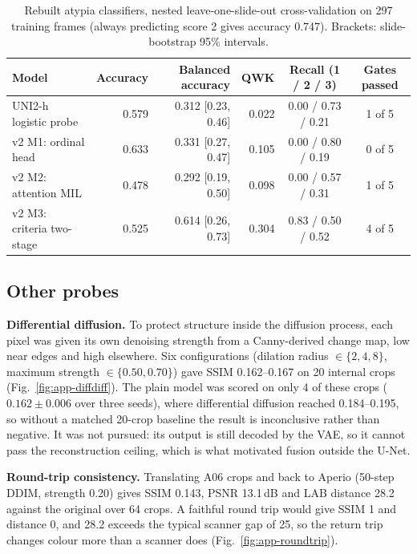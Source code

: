 \begin{table}[!tbp]
\centering
\caption{Rebuilt atypia classifiers, nested leave-one-slide-out cross-validation on 297 training frames
(always predicting score 2 gives accuracy 0.747). Brackets: slide-bootstrap 95\% intervals.}
\label{tab:atypia}
\small
\begin{tabular}{lrrrcc}
\toprule
Model & Accuracy & Balanced accuracy & QWK & Recall (1 / 2 / 3) & Gates passed\\
\midrule
UNI2-h logistic probe & 0.579 & 0.312 [0.23, 0.46] & 0.022 & 0.00 / 0.73 / 0.21 & 1 of 5\\
v2 M1: ordinal head & 0.633 & 0.331 [0.27, 0.47] & 0.105 & 0.00 / 0.80 / 0.19 & 0 of 5\\
v2 M2: attention MIL & 0.478 & 0.292 [0.19, 0.50] & 0.098 & 0.00 / 0.57 / 0.31 & 1 of 5\\
v2 M3: criteria two-stage & 0.525 & 0.614 [0.26, 0.73] & 0.304 & 0.83 / 0.50 / 0.52 & 4 of 5\\
\bottomrule
\end{tabular}
\end{table}

\subsection{Other probes}
\textbf{Differential diffusion.} To protect structure inside the diffusion process, each pixel was given
its own denoising strength from a Canny-derived change map, low near edges and high elsewhere. Six
configurations (dilation radius $\in\{2,4,8\}$, maximum strength $\in\{0.50,0.70\}$) gave SSIM 0.162--0.167
on 20 internal crops (Fig.~\ref{fig:app-diffdiff}). The plain model was scored on only 4 of these crops
($0.162\pm0.006$ over three seeds), where differential diffusion reached 0.184--0.195, so without a matched
20-crop baseline the result is inconclusive rather than negative. It was not pursued: its output is still
decoded by the VAE, so it cannot pass the reconstruction ceiling, which is what motivated fusion outside the U-Net.

\textbf{Round-trip consistency.} Translating A06 crops \AtoH{} and back to Aperio (50-step DDIM, strength
0.20) gives SSIM 0.143, PSNR 13.1\,dB and LAB distance 28.2 against the original
over 64 crops. A faithful round trip would give SSIM 1 and distance 0, and 28.2 exceeds the typical scanner
gap of 25, so the return trip changes colour more than a scanner does (Fig.~\ref{fig:app-roundtrip}).

